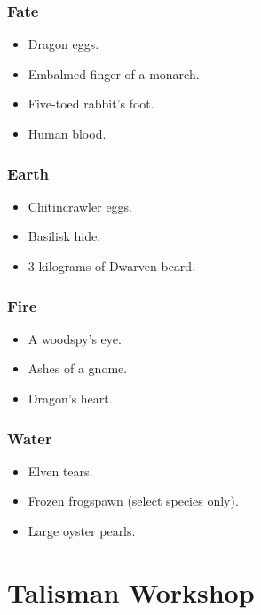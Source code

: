 \begin{multicols}{2}
\subsubsection{Fate}

\begin{itemize}
  \item
  Dragon eggs.
  \item
  Embalmed finger of a monarch.
  \item
  Five-toed rabbit's foot.
  \item
  Human blood.
\end{itemize}

\subsubsection{Earth}

\begin{itemize}
  \item
  Chitincrawler eggs.
  \item
  Basilisk hide.
  \item
  3 kilograms of Dwarven beard.
\end{itemize}

\subsubsection{Fire}

\begin{itemize}
  \item
  A woodspy's eye.
  \item
  Ashes of a gnome.
  \item
  Dragon's heart.
\end{itemize}

\subsubsection{Water}

\begin{itemize}
  \item
  Elven tears.
  \item
  Frozen frogspawn (select species only).
  \item
  Large oyster pearls.
\end{itemize}

\end{multicols}

\section{Talisman Workshop}

